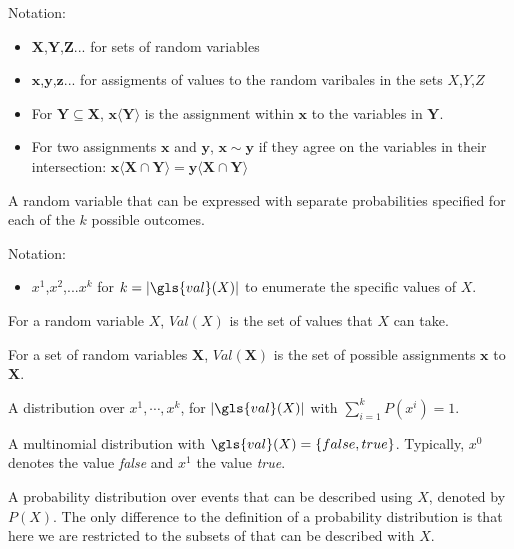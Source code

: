 {%
  Notation:
  \begin{itemize}
    \item $\bm{X}$,$\bm{Y}$,$\bm{Z}$... for sets of \glspl{random variable}
    \item $\bm{x}$,$\bm{y}$,$\bm{z}$... for assigments of values to the random varibales in the sets $X$,$Y$,$Z$
    \item For $\bm{Y}\subseteq \bm{X}$, $\bm{x}\langle \bm{Y}\rangle$ is the assignment within $\bm{x}$ to the variables in $\bm{Y}$.
    \item For two assignments $\bm{x}$ and $\bm{y}$, $\bm{x}\sim \bm{y}$ if they agree on the variables in their intersection: $\bm{x}\langle\bm{X}\cap\bm{Y}\rangle=\bm{y}\langle\bm{X}\cap\bm{Y}\rangle$
  \end{itemize}
}

{%
  A \gls{random variable} that can be expressed with separate probabilities specified for each of the $k$ possible outcomes.

  Notation:
  \begin{itemize}
    \item $x^1$,$x^2$,...$x^k$ for $k=\lvert\gls{val}(X)\rvert$ to enumerate the specific values of $X$.
  \end{itemize}
}

{%
  For a \gls{random variable} $X$, $Val(X)$ is the set of values that $X$ can take.

  For a \gls{set of random variables} $\bm{X}$, $Val(\bm{X})$ is the set of possible assignments $\bm{x}$ to $\bm{X}$.
}

{%
  A distribution over $x^1,\cdots,x^k$, for $\lvert\gls{val}(X)\rvert$ with $\sum_{i=1}^k P(x^i)=1$.
}

{%
  A \gls{multinomial distribution} with $\gls{val}(X)=\{false,true\}$. Typically, $x^0$ denotes the value \textit{false} and $x^1$ the value \textit{true}.
}

{%
  A \gls{probability distribution} over events that can be described using $X$, denoted by $P(X)$. The only difference to the definition of a \gls{probability distribution} is that here we are restricted to the subsets of  that can be described with $X$.
}

